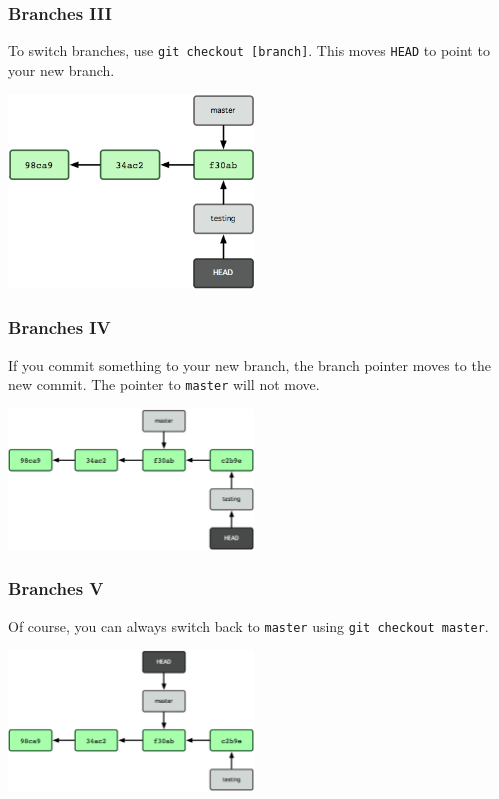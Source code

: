 \documentclass{beeper}
\begin{document}
\begin{frame}
    \frametitle{Branches III}
    To switch branches, use \texttt{git checkout [branch]}. This moves
    \texttt{HEAD} to point to your new branch.

    \begin{center}
        \includegraphics[width=65mm]{graphics/branching2.png}
    \end{center}
\end{frame}

\begin{frame}
    \frametitle{Branches IV}
    If you commit something to your new branch, the branch pointer moves to the
    new commit. The pointer to \texttt{master} will not move.

    \begin{center}
        \includegraphics[width=65mm]{graphics/branching3.png}
    \end{center}
\end{frame}

\begin{frame}
    \frametitle{Branches V}
    Of course, you can always switch back to \texttt{master} using \texttt{git
    checkout master}.

    \begin{center}
        \includegraphics[width=65mm]{graphics/branching4.png}
    \end{center}
\end{frame}
\end{document}
